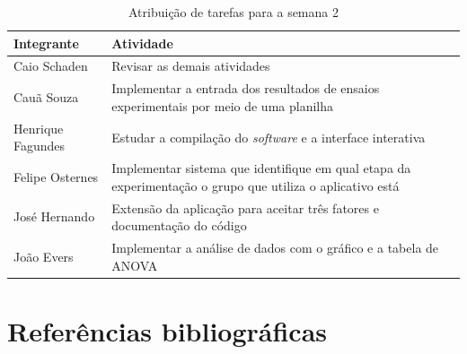 \documentclass[12pt]{article}
\begin{document}
\begin{table}[H]
    \centering
    \caption{Atribuição de tarefas para a semana 2}
    \begin{tabular}{l p{10cm}} 
        \toprule
        \textbf{Integrante} & \textbf{Atividade} \\
        \midrule  
        Caio Schaden & Revisar as demais atividades \\
        Cauã Souza & Implementar a entrada dos resultados de ensaios experimentais por meio de uma planilha \\
        Henrique Fagundes & Estudar a compilação do \textit{software} e a interface interativa \\
        Felipe Osternes & Implementar sistema que identifique em qual etapa da experimentação o grupo que utiliza o aplicativo está \\
        José Hernando & Extensão da aplicação para aceitar três fatores e documentação do código \\
        João Evers & Implementar a análise de dados com o gráfico e a tabela de ANOVA \\
        \bottomrule
    \end{tabular}
    \label{tab:taskmng}
\end{table}

\newpage

\section*{Referências bibliográficas}
\begingroup
\renewcommand{\section}[2]{}

\endgroup
\end{document}
